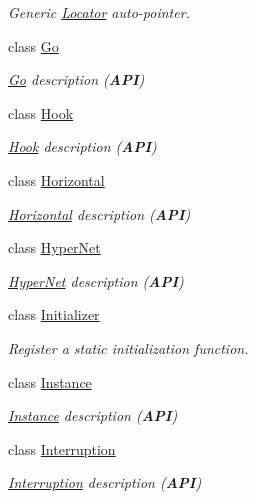 \begin{DoxyCompactItemize}
\begin{DoxyCompactList}\small\item\em Generic \mbox{\hyperlink{classHurricane_1_1Locator}{Locator}} auto-\/pointer. \end{DoxyCompactList}\item 
class \mbox{\hyperlink{classHurricane_1_1Go}{Go}}
\begin{DoxyCompactList}\small\item\em \mbox{\hyperlink{classHurricane_1_1Go}{Go}} description ({\bfseries A\+PI}) \end{DoxyCompactList}\item 
class \mbox{\hyperlink{classHurricane_1_1Hook}{Hook}}
\begin{DoxyCompactList}\small\item\em \mbox{\hyperlink{classHurricane_1_1Hook}{Hook}} description ({\bfseries A\+PI}) \end{DoxyCompactList}\item 
class \mbox{\hyperlink{classHurricane_1_1Horizontal}{Horizontal}}
\begin{DoxyCompactList}\small\item\em \mbox{\hyperlink{classHurricane_1_1Horizontal}{Horizontal}} description ({\bfseries A\+PI}) \end{DoxyCompactList}\item 
class \mbox{\hyperlink{classHurricane_1_1HyperNet}{Hyper\+Net}}
\begin{DoxyCompactList}\small\item\em \mbox{\hyperlink{classHurricane_1_1HyperNet}{Hyper\+Net}} description ({\bfseries A\+PI}) \end{DoxyCompactList}\item 
class \mbox{\hyperlink{classHurricane_1_1Initializer}{Initializer}}
\begin{DoxyCompactList}\small\item\em Register a static initialization function. \end{DoxyCompactList}\item 
class \mbox{\hyperlink{classHurricane_1_1Instance}{Instance}}
\begin{DoxyCompactList}\small\item\em \mbox{\hyperlink{classHurricane_1_1Instance}{Instance}} description ({\bfseries A\+PI}) \end{DoxyCompactList}\item 
class \mbox{\hyperlink{classHurricane_1_1Interruption}{Interruption}}
\begin{DoxyCompactList}\small\item\em \mbox{\hyperlink{classHurricane_1_1Interruption}{Interruption}} description ({\bfseries A\+PI}) \end{DoxyCompactList}\item 

\end{DoxyCompactItemize}
